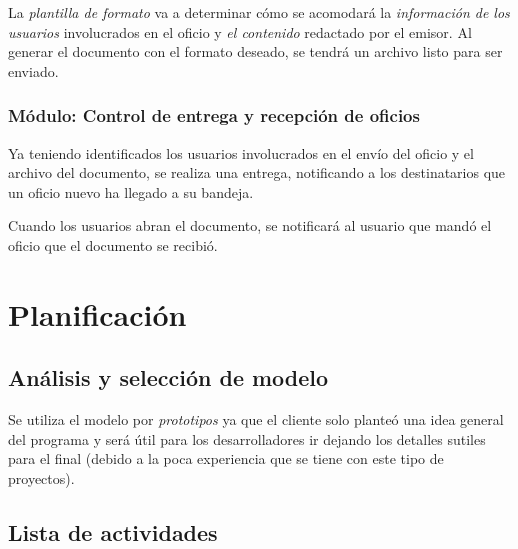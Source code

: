 \documentclass[letterpaper]{article}
\begin{document}
La \emph{plantilla de formato} va a determinar cómo se acomodará la \emph{información de los usuarios} involucrados en el oficio y \emph{el contenido} redactado por el emisor. Al generar el documento con el formato deseado, se tendrá un archivo listo para ser enviado.

\subsubsection{Módulo: Control de entrega y recepción de oficios}
Ya teniendo identificados los usuarios involucrados en el envío del oficio y el archivo del documento, se realiza una entrega, notificando a los destinatarios que un oficio nuevo ha llegado a su bandeja.

Cuando los usuarios abran el documento, se notificará al usuario que mandó el oficio que el documento se recibió.

\section{Planificación}

\subsection{Análisis y selección de modelo}
Se utiliza el modelo por \emph{prototipos} ya que el cliente solo planteó una idea general del programa y será útil para los desarrolladores ir dejando los detalles sutiles para el final (debido a la poca experiencia que se tiene con este tipo de proyectos).

\subsection{Lista de actividades}
\end{document}
